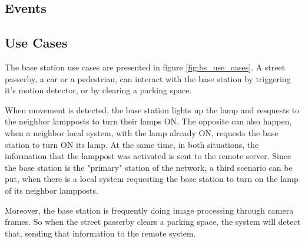 \subsection{Events}

\begin{table}[h]
	\centering
	
	\caption{Base station events.}
	\label{table:bs_events}
\end{table}


\subsection{Use Cases}
The base station use cases are presented in figure \ref{fig:bs_use_cases}. A street passerby, a car or a pedestrian, can interact with the base station by triggering it's motion detector, or by clearing a parking space.

When movement is detected, the base station lights up the lamp and resquests to the neighbor lampposts to turn their lamps ON. The opposite can also happen, when a neighbor local system, with the lamp already ON, requests the base station to turn ON its lamp. At the same time, in both situations, the information that the lamppost was activated is sent to the remote server. Since the base station is the "primary" station of the network, a third scenario can be put, when there is a local system requesting the base station to turn on the lamp of its neighbor lampposts.

Moreover, the base station is frequently doing image processing through camera frames. So when the street passerby clears a parking space, the system will detect that, sending that information to the remote system.


